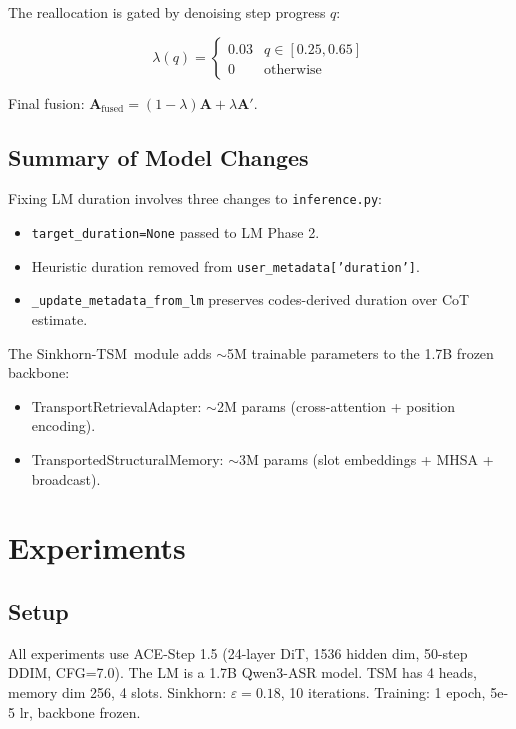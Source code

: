 \documentclass[11pt,a4paper]{article}
\newcommand{\method}{Sinkhorn-TSM}
\begin{document}
The reallocation is gated by denoising step progress $q$:

\[
\lambda(q) =
\begin{cases}
0.03 & q \in [0.25, 0.65] \\
0 & \text{otherwise}
\end{cases}
\]

Final fusion: $\mathbf{A}_{\text{fused}} = (1-\lambda) \mathbf{A} + \lambda \mathbf{A}'$.

\subsection{Summary of Model Changes}

Fixing LM duration involves three changes to \texttt{inference.py}:
\begin{itemize}
    \item \texttt{target\_duration=None} passed to LM Phase 2.
    \item Heuristic duration removed from \texttt{user\_metadata['duration']}.
    \item \texttt{\_update\_metadata\_from\_lm} preserves codes-derived duration over CoT estimate.
\end{itemize}

The \method~module adds $\sim$5M trainable parameters to the 1.7B frozen backbone:
\begin{itemize}
    \item TransportRetrievalAdapter: $\sim$2M params (cross-attention + position encoding).
    \item TransportedStructuralMemory: $\sim$3M params (slot embeddings + MHSA + broadcast).
\end{itemize}

\section{Experiments}
\label{sec:exp}

\subsection{Setup}

All experiments use ACE-Step 1.5 (24-layer DiT, 1536 hidden dim, 50-step DDIM, CFG=7.0). The LM is a 1.7B Qwen3-ASR model. TSM has 4 heads, memory dim 256, 4 slots. Sinkhorn: $\varepsilon=0.18$, 10 iterations. Training: 1 epoch, 5e-5 lr, backbone frozen.
\end{document}
